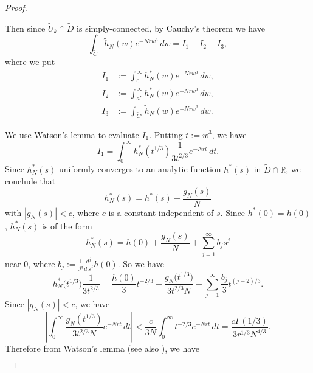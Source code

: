 \documentclass[a4paper,dvipdfmx]{amsart}
\theoremstyle{plain}
\theoremstyle{definition}
\theoremstyle{remark}
\newcommand{\R}{\mathbb{R}}
\numberwithin{equation}{section}
\begin{document}
\begin{proof}
\begin{enumerate}
\end{enumerate}
Then since $\tilde{U}_{k}\cap\tilde{D}$ is simply-connected, by Cauchy's theorem we have
\begin{equation}\label{eq:Cauchy}
  \int_{\tilde{C}}\tilde{h}_N(w)e^{-Nrw^3}\,dw
  =
  I_1-I_2-I_3,
\end{equation}
where we put
\begin{align*}
  I_1
  &:=
  \int_{0}^{\infty}h_N^{\ast}(w)e^{-Nrw^3}\,dw,
  \\
  I_2
  &:=
  \int_{\tilde{a}'}^{\infty}h_N^{\ast}(w)e^{-Nrw^3}\,dw,
  \\
  I_3
  &:=
  \int_{\tilde{C}'}\tilde{h}_N(w)e^{-Nrw^3}\,dw.
\end{align*}
\par
We use Watson's lemma \cite{Watson:PROLM1918} to evaluate $I_1$.
Putting $t:=w^3$, we have
\begin{equation*}
  I_1
  =
  \int_{0}^{\infty}
  h_N^{\ast}\left(t^{1/3}\right)\frac{1}{3t^{2/3}}e^{-Nrt}\,dt.
\end{equation*}
Since $h_N^{\ast}(s)$ uniformly converges to an analytic function $h^{\ast}(s)$ in $\tilde{D}\cap\R$, we conclude that
\begin{equation*}
  h_N^{\ast}(s)
  =
  h^{\ast}(s)
  +
  \frac{g_N(s)}{N}
\end{equation*}
with $|g_N(s)|<c$, where $c$ is a constant independent of $s$.
Since $h^{\ast}(0)=h(0)$, $h_N^{\ast}(s)$ is of the form
\begin{equation*}
  h_N^{\ast}(s)
  =
  h(0)+\frac{g_N(s)}{N}+\sum_{j=1}^{\infty}b_{j}s^j
\end{equation*}
near $0$, where $b_{j}:=\frac{1}{j!}\frac{d^j}{d\,s^j}h(0)$.
So we have
\begin{equation*}
  h_N^{\ast}\bigl(t^{1/3}\bigr)\frac{1}{3t^{2/3}}
  =
  \frac{h(0)}{3}t^{-2/3}
  +
  \frac{g_N\bigl(t^{1/3}\bigr)}{3t^{2/3}N}
  +
  \sum_{j=1}^{\infty}\frac{b_{j}}{3}t^{(j-2)/3}.
\end{equation*}
Since $|g_N(s)|<c$, we have
\begin{equation*}
  \left|
    \int_{0}^{\infty}\frac{g_N(t^{1/3})}{3t^{2/3}N}e^{-Nrt}\,dt
  \right|
  <
  \frac{c}{3N}
  \int_{0}^{\infty}t^{-2/3}e^{-Nrt}\,dt
  =
  \frac{c\Gamma(1/3)}{3r^{1/3}N^{4/3}}.
\end{equation*}
Therefore from Watson's lemma \cite[P.~133]{Watson:PROLM1918} (see also \cite[P.~20]{Wong:1989}), we have
\begin{equation}\label{eq:Watson}
\begin{split}

\end{split}
\end{equation}
\end{proof}
\end{document}
